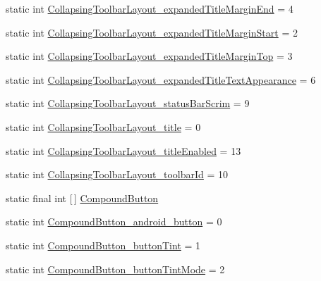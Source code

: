 \begin{DoxyCompactItemize}
\item 
static int \hyperlink{classandroid_1_1support_1_1v7_1_1appcompat_1_1R_1_1styleable_ad4ab1dac8092468e823d2ec10e403b6c}{Collapsing\+Toolbar\+Layout\+\_\+expanded\+Title\+Margin\+End} = 4
\item 
static int \hyperlink{classandroid_1_1support_1_1v7_1_1appcompat_1_1R_1_1styleable_a1f5a83e047a2bec57c2d0fe4f5fff481}{Collapsing\+Toolbar\+Layout\+\_\+expanded\+Title\+Margin\+Start} = 2
\item 
static int \hyperlink{classandroid_1_1support_1_1v7_1_1appcompat_1_1R_1_1styleable_a0d5fd646e714ea1e44ffb383a0fff8cf}{Collapsing\+Toolbar\+Layout\+\_\+expanded\+Title\+Margin\+Top} = 3
\item 
static int \hyperlink{classandroid_1_1support_1_1v7_1_1appcompat_1_1R_1_1styleable_af1872845d84b104e9c1a63abd2fadcd0}{Collapsing\+Toolbar\+Layout\+\_\+expanded\+Title\+Text\+Appearance} = 6
\item 
static int \hyperlink{classandroid_1_1support_1_1v7_1_1appcompat_1_1R_1_1styleable_a8dd3d1989f1de8df8670da0cf881bb53}{Collapsing\+Toolbar\+Layout\+\_\+status\+Bar\+Scrim} = 9
\item 
static int \hyperlink{classandroid_1_1support_1_1v7_1_1appcompat_1_1R_1_1styleable_a287b485120735165da1ae86c6c16c174}{Collapsing\+Toolbar\+Layout\+\_\+title} = 0
\item 
static int \hyperlink{classandroid_1_1support_1_1v7_1_1appcompat_1_1R_1_1styleable_a9dbf91222ca3cd313d450c7f1c17db70}{Collapsing\+Toolbar\+Layout\+\_\+title\+Enabled} = 13
\item 
static int \hyperlink{classandroid_1_1support_1_1v7_1_1appcompat_1_1R_1_1styleable_a9b1b730dcc059136fa07007ab41fcc78}{Collapsing\+Toolbar\+Layout\+\_\+toolbar\+Id} = 10
\item 
static final int \mbox{[}$\,$\mbox{]} \hyperlink{classandroid_1_1support_1_1v7_1_1appcompat_1_1R_1_1styleable_aa66e991e0d5dc9db5a9048c91817235f}{Compound\+Button}
\item 
static int \hyperlink{classandroid_1_1support_1_1v7_1_1appcompat_1_1R_1_1styleable_a55ce03c45fd67f3f9d49bc0a3eff3230}{Compound\+Button\+\_\+android\+\_\+button} = 0
\item 
static int \hyperlink{classandroid_1_1support_1_1v7_1_1appcompat_1_1R_1_1styleable_a332cba791529259530adf3858cb6f97b}{Compound\+Button\+\_\+button\+Tint} = 1
\item 
static int \hyperlink{classandroid_1_1support_1_1v7_1_1appcompat_1_1R_1_1styleable_a0365578c9542a2110fb6a88b59d2d604}{Compound\+Button\+\_\+button\+Tint\+Mode} = 2

\end{DoxyCompactItemize}
